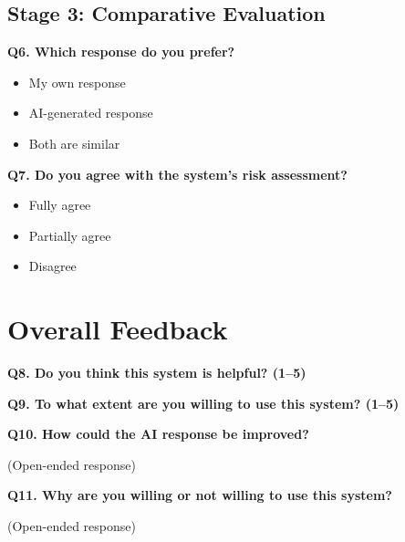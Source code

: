 \documentclass[12pt,a4paper]{report}
\begin{document}
\subsection{Stage 3: Comparative Evaluation}

\textbf{Q6. Which response do you prefer?}

\begin{itemize}
    \item My own response
    \item AI-generated response
    \item Both are similar
\end{itemize}

\vspace{0.3cm}

\textbf{Q7. Do you agree with the system's risk assessment?}

\begin{itemize}
    \item Fully agree
    \item Partially agree
    \item Disagree
\end{itemize}


\section{Overall Feedback}

\textbf{Q8. Do you think this system is helpful? (1–5)}

\vspace{0.3cm}

\textbf{Q9. To what extent are you willing to use this system? (1–5)}

\vspace{0.3cm}

\textbf{Q10. How could the AI response be improved?}

(Open-ended response)

\vspace{0.3cm}

\textbf{Q11. Why are you willing or not willing to use this system?}

(Open-ended response)
\end{document}
